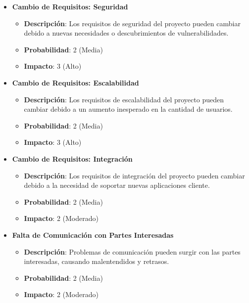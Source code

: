 \documentclass{article}
\begin{document}
\begin{itemize}
    \item \textbf{Cambio de Requisitos: Seguridad}
          \begin{itemize}
              \item \textbf{Descripción}: Los requisitos de seguridad del proyecto pueden cambiar debido a nuevas necesidades o descubrimientos de vulnerabilidades.
              \item \textbf{Probabilidad}: 2 (Media)
              \item \textbf{Impacto}: 3 (Alto)
          \end{itemize}

    \item \textbf{Cambio de Requisitos: Escalabilidad}
          \begin{itemize}
              \item \textbf{Descripción}: Los requisitos de escalabilidad del proyecto pueden cambiar debido a un aumento inesperado en la cantidad de usuarios.
              \item \textbf{Probabilidad}: 2 (Media)
              \item \textbf{Impacto}: 3 (Alto)
          \end{itemize}

    \item \textbf{Cambio de Requisitos: Integración}
          \begin{itemize}
              \item \textbf{Descripción}: Los requisitos de integración del proyecto pueden cambiar debido a la necesidad de soportar nuevas aplicaciones cliente.
              \item \textbf{Probabilidad}: 2 (Media)
              \item \textbf{Impacto}: 2 (Moderado)
          \end{itemize}

    \item \textbf{Falta de Comunicación con Partes Interesadas}
          \begin{itemize}
              \item \textbf{Descripción}: Problemas de comunicación pueden surgir con las partes interesadas, causando malentendidos y retrasos.
              \item \textbf{Probabilidad}: 2 (Media)
              \item \textbf{Impacto}: 2 (Moderado)
          \end{itemize}


\end{itemize}
\end{document}
